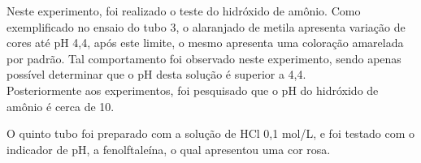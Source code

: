 \begin{figure}[h]
            \label{fig:experimento13}
        \end{figure}
    	
    	\indent Neste experimento, foi realizado o teste do hidróxido de amônio. Como exemplificado no ensaio do tubo 3, o alaranjado de metila apresenta variação de cores até pH 4,4, após este limite, o mesmo apresenta uma coloração amarelada por padrão. Tal comportamento foi observado neste experimento, sendo apenas possível determinar que o pH desta solução é superior a 4,4. \\
    	
    	\indent Posteriormente aos experimentos, foi pesquisado que o pH do hidróxido de amônio é cerca de 10.
    	

        \newpage

        \indent O quinto tubo foi preparado com a solução de HCl 0,1 mol/L, e foi testado com o indicador de pH, a fenolftaleína, o qual apresentou uma cor rosa.

